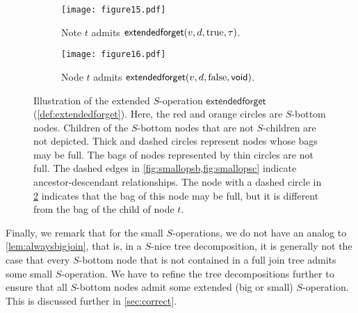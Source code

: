 \documentclass[a4paper,UKenglish,cleveref, autoref, thm-restate, numberwithinsect]{lipics-v2021}
\newcommand{\extendedforget}{\mathsf{extendedforget}}
\newcommand{\void}{\mathsf{void}}
\newcommand{\true}{\textup{true}}
\newcommand{\false}{\textup{false}}
\newcommand{\slim}{\text{slim}\xspace}
\begin{document}
\begin{figure}[t]
\centering
\begin{subfigure}[t]{0.46\textwidth}
\centering
\texttt{[image: figure15.pdf]}
\caption{Note $t$ admits $\extendedforget(v,d,\true,\tau)$.}\label{fig:smallopsb}
\end{subfigure}
\begin{subfigure}[t]{0.46\textwidth}
\centering
\texttt{[image: figure16.pdf]}
\caption{Node $t$ admits $\extendedforget(v,d,\false,\void)$.}\label{fig:smallopsc}
\end{subfigure}
\caption{Illustration of the extended $S$-operation $\extendedforget$ (\cref{def:extendedforget}). Here, the red and orange circles are $S$-bottom nodes. Children of the $S$-bottom nodes that are not $S$-children are not depicted. Thick and dashed circles represent nodes whose bags may be full. The bags of nodes represented by thin circles are not full. 
The dashed edges in \cref{fig:smallopsb,fig:smallopsc} indicate ancestor-descendant relationships. The node with a dashed circle in \cref{fig:smallopsc} indicates that the bag of this node may be full, but it is different from the bag of the child of node $t$.}\label{fig:extforget}
\end{figure}

Finally, we remark that for the small $S$-operations, we do not have an analog to \cref{lem:alwaysbigjoin}, that is, in a \slim $S$-nice tree decomposition, it is generally not the case that every $S$-bottom node that is not contained in a full join tree admits some small $S$-operation. We have to refine the tree decompositions further to ensure that all $S$-bottom nodes admit some extended (big or small) $S$-operation. This is discussed further in \cref{sec:correct}.
\end{document}
